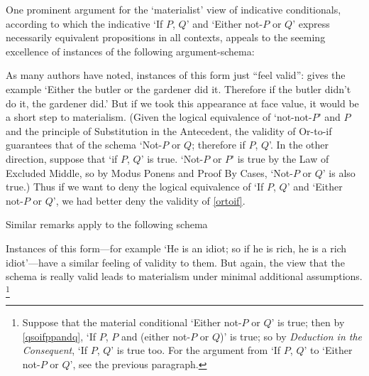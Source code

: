 \documentclass[If.tex]{subfiles}
\begin{document}
One prominent argument for the ‘materialist’ view of indicative conditionals, according to which the indicative ‘If $P$, $Q$’ and ‘Either not-$P$ or $Q$’ express necessarily equivalent propositions in all contexts, appeals to the seeming excellence of instances of the following argument-schema:
\begin{prop}
	\litem[Or-to-if] \label{ortoif}
\end{prop}
As many authors have noted, instances of this form just “feel valid”: \citet{StalnakerIC} gives the example ‘Either the butler or the gardener did it.  Therefore if the butler didn't do it, the gardener did.’  But if we took this appearance at face value, it would be a short step to materialism.  (Given the logical equivalence of ‘not-not-$P$’ and $P$ and the principle of Substitution in the Antecedent, the validity of Or-to-if guarantees that of the schema ‘Not-$P$ or $Q$; therefore if $P$, $Q$’.  In the other direction, suppose that ‘if $P$, $Q$’ is true.   ‘Not-$P$ or $P$’ is true by the Law of Excluded Middle, so by Modus Ponens and Proof By Cases, ‘Not-$P$ or $Q$’ is also true.)  Thus if we want to deny the logical equivalence of ‘If $P$, $Q$’ and ‘Either not-$P$ or $Q$’, we had better deny the validity of \ref{ortoif}.  

Similar remarks apply to the following schema
\begin{prop}
	 \label{qsoifppandq}
\end{prop}
Instances of this form---for example ‘He is an idiot; so if he is rich, he is a rich idiot’---have a similar feeling of validity to them.  But again, the view that the schema is really valid leads to materialism under minimal additional assumptions.%
\footnote{Suppose that the material conditional ‘Either not-$P$ or $Q$’ is true; then by \ref{qsoifppandq}, ‘If $P$, $P$ and (either not-$P$ or $Q$)’ is true; so by \emph{Deduction in the Consequent}, ‘If $P$, $Q$’ is true too.  For the argument from ‘If $P$, $Q$’ to ‘Either not-$P$ or $Q$’, see the previous paragraph.}
\end{document}
